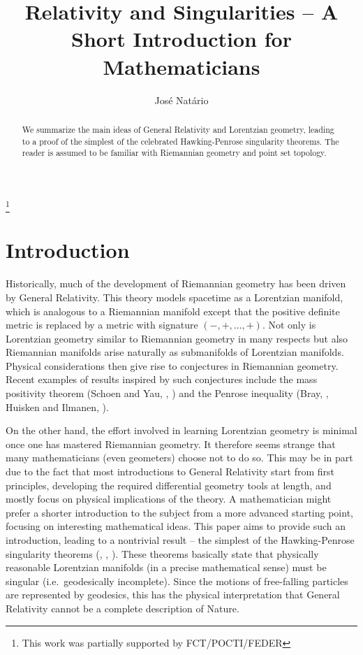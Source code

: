 \documentclass[12pt]{amsart}
\theoremstyle{definition}
\theoremstyle{remark}
\begin{document}
%
%
\begin{abstract}
We summarize the main ideas of General Relativity and Lorentzian geometry, leading to a proof of the simplest of the celebrated Hawking-Penrose singularity theorems. The reader is assumed to be familiar with Riemannian geometry and point set topology.
\end{abstract}
%
%
\title[Relativity and Singularities]{Relativity and Singularities -- A Short Introduction for Mathematicians}
%
\author{Jos\'{e} Nat\'{a}rio}
\address{Department of Mathematics, Instituto Superior T\'{e}cnico, Portugal}
\thanks{This work was partially supported by FCT/POCTI/FEDER}
%
%
\maketitle
%
%
%
\section*{Introduction}
%
Historically, much of the development of Riemannian geometry has been driven by General Relativity. This theory models spacetime as a Lorentzian manifold, which is analogous to a Riemannian manifold except that the positive definite metric is replaced by a metric with signature $(-,+, \ldots, +)$. Not only is Lorentzian geometry similar to Riemannian geometry in many respects but also Riemannian manifolds arise naturally as submanifolds of Lorentzian manifolds. Physical considerations then give rise to conjectures in Riemannian geometry. Recent examples of results inspired by such conjectures include the mass positivity theorem (Schoen and Yau, \cite{SY79}, \cite{SY81}) and the Penrose inequality (Bray, \cite{B01}, Huisken and Ilmanen, \cite{HI01}).

On the other hand, the effort involved in learning Lorentzian geometry is minimal once one has mastered Riemannian geometry. It therefore seems strange that many mathematicians (even geometers) choose not to do so. This may be in part due to the fact that most introductions to General Relativity start from first principles, developing the required differential geometry tools at length, and mostly focus on physical implications of the theory. A mathematician might prefer a shorter introduction to the subject from a more advanced starting point, focusing on interesting mathematical ideas. This paper aims to provide such an introduction, leading to a nontrivial result -- the simplest of the Hawking-Penrose singularity theorems (\cite{P65}, \cite{H67}, \cite{HP70}). These theorems basically state that physically reasonable Lorentzian manifolds (in a precise mathematical sense) must be singular (i.e.~geodesically incomplete). Since the motions of free-falling particles are represented by geodesics, this has the physical interpretation that General Relativity cannot be a complete description of Nature.
\end{document}
